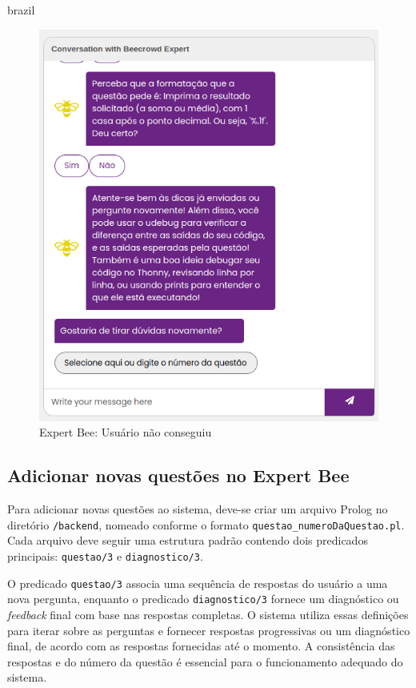 \begin{otherlanguage*}{brazil}
\begin{figure}[H]
    \centering
            \caption{Expert Bee: Usuário não conseguiu}
            \label{fig:ModeloConceitual}
        \includegraphics[scale=0.63]{pictures/desenvolvimento/expert_bee_final_nao_deu_certo.png}
\end{figure}

\subsection{Adicionar novas questões no Expert Bee}

Para adicionar novas questões ao sistema, deve-se criar um arquivo Prolog no diretório \texttt{/backend}, nomeado conforme o formato \texttt{questao\_{numeroDaQuestao}.pl}. Cada arquivo deve seguir uma estrutura padrão contendo dois predicados principais: \texttt{questao/3} e \texttt{diagnostico/3}.

O predicado \texttt{questao/3} associa uma sequência de respostas do usuário a uma nova pergunta, enquanto o predicado \texttt{diagnostico/3} fornece um diagnóstico ou \textit{feedback} final com base nas respostas completas. O sistema utiliza essas definições para iterar sobre as perguntas e fornecer respostas progressivas ou um diagnóstico final, de acordo com as respostas fornecidas até o momento. A consistência das respostas e do número da questão é essencial para o funcionamento adequado do sistema.


\end{otherlanguage*}
